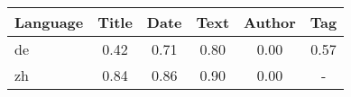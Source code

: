 \renewcommand{\arraystretch}{1.15}

\begin{tabular}{|l|ccccc|}
\hline
Language & Title & Date & Text & Author & Tag \\
\hline
de & 0.42 & 0.71 & 0.80 & 0.00 & 0.57 \\
zh & 0.84 & 0.86 & 0.90 & 0.00 & - \\
\hline
\end{tabular}
